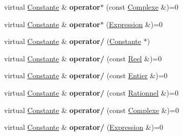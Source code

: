 \begin{DoxyCompactItemize}
\item 
\hypertarget{class_constante_a65a3360420827c4c7953052ff87b2457}{virtual \hyperlink{class_constante}{Constante} \& {\bfseries operator$\ast$} (const \hyperlink{class_complexe}{Complexe} \&)=0}\label{class_constante_a65a3360420827c4c7953052ff87b2457}

\item 
\hypertarget{class_constante_a51016ec3398e1a5f2ba4cea752c5c7db}{virtual \hyperlink{class_constante}{Constante} \& {\bfseries operator$\ast$} (\hyperlink{class_expression}{Expression} \&)=0}\label{class_constante_a51016ec3398e1a5f2ba4cea752c5c7db}

\item 
\hypertarget{class_constante_a9be1827fd118f5a81cf10b509b64cfa7}{virtual \hyperlink{class_constante}{Constante} \& {\bfseries operator/} (\hyperlink{class_constante}{Constante} $\ast$)}\label{class_constante_a9be1827fd118f5a81cf10b509b64cfa7}

\item 
\hypertarget{class_constante_a0355225f82499fabe7e64a5a09866fdb}{virtual \hyperlink{class_constante}{Constante} \& {\bfseries operator/} (const \hyperlink{class_reel}{Reel} \&)=0}\label{class_constante_a0355225f82499fabe7e64a5a09866fdb}

\item 
\hypertarget{class_constante_ac90f8c29c86fa9ccb15a44c64b14ee87}{virtual \hyperlink{class_constante}{Constante} \& {\bfseries operator/} (const \hyperlink{class_entier}{Entier} \&)=0}\label{class_constante_ac90f8c29c86fa9ccb15a44c64b14ee87}

\item 
\hypertarget{class_constante_a8c0dfdc199f6a8feff5038abf75c2b98}{virtual \hyperlink{class_constante}{Constante} \& {\bfseries operator/} (const \hyperlink{class_rationnel}{Rationnel} \&)=0}\label{class_constante_a8c0dfdc199f6a8feff5038abf75c2b98}

\item 
\hypertarget{class_constante_a5944c154c12015c0af36ef5fdb2e851b}{virtual \hyperlink{class_constante}{Constante} \& {\bfseries operator/} (const \hyperlink{class_complexe}{Complexe} \&)=0}\label{class_constante_a5944c154c12015c0af36ef5fdb2e851b}

\item 
\hypertarget{class_constante_a2c2e07511d0e5883ef337351b2121606}{virtual \hyperlink{class_constante}{Constante} \& {\bfseries operator/} (\hyperlink{class_expression}{Expression} \&)=0}\label{class_constante_a2c2e07511d0e5883ef337351b2121606}


\end{DoxyCompactItemize}
